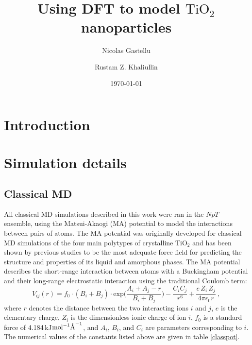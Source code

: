 \documentclass[aps,prb,twocolumn,amsmath,amssymb,superscriptaddress,longbibliography]{revtex4-1}
\newcommand{\angstrom}{\text{\normalfont\AA}}
\newcommand\tab[1][1cm]{\hspace*{#1}} %
\begin{document}
\title{
Using DFT to model $\text{TiO}_2$ nanoparticles
}

\author{Nicolas Gastellu}
\author{Rustam Z. Khaliullin}

\date{\today}

\begin{abstract} 

\end{abstract}

\maketitle
 

\section*{Introduction} 

\section*{Simulation details}

\subsection*{Classical MD}

\tab All classical MD simulations described in this work were ran in the $NpT$ ensemble, using the Matsui-Akaogi (MA) potential to model the interactions between pairs of atoms.
The MA potential was originally developed for classical MD simulations of the four main polytypes of crystalline $\text{TiO}_2$ and has been shown by previous studies to be the most adequate force field for predicting the structure and properties of its liquid and amorphous phases.
The MA potential describes the short-range interaction between atoms with a Buckingham potential and their long-range electrostatic interaction using the traditional Coulomb term:
\begin{equation}
V_{ij}(r) = f_{0}\cdot (B_i+B_j)\cdot\text{exp}\big(\frac{A_i + A_j - r}{B_i + B_j}\big) - \frac{C_{i}C_j}{r^6} + \frac{e\,Z_i\,Z_j}{4\pi\epsilon_0 r}\: ,
\end{equation}
where $r$ denotes the distance between the two interacting ions $i$ and $j$, $e$ is the elementary charge, $Z_i$ is the dimensionless ionic charge of ion $i$, $f_0$ is a standard force of 4.184$\,$kJ$\text{mol}^{-1}\angstrom^{-1}$, and $A_i$, $B_i$, and $C_i$ are parameters corresponding to $i$.
The numerical values of the constants listed above are given in table \ref{classpot}.
\end{document}
